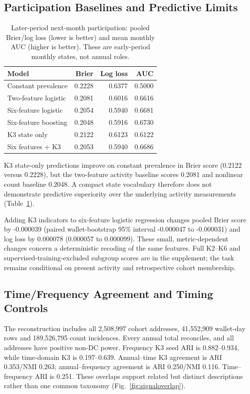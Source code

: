 \documentclass[journal,letterpaper]{IEEEtran}
\begin{document}
\subsection{Participation Baselines and Predictive Limits}
\begin{table}[t]
\centering\footnotesize
\caption{Later-period next-month participation: pooled Brier/log loss (lower is better) and mean monthly AUC (higher is better). These are early-period monthly states, not annual roles.}
\label{tab:participationprediction}
\begin{tabular}{lrrr}
\toprule
Model & Brier & Log loss & AUC \\
\midrule
Constant prevalence & 0.2228 & 0.6377 & 0.5000 \\
Two-feature logistic & 0.2081 & 0.6016 & 0.6616 \\
Six-feature logistic & 0.2054 & 0.5940 & 0.6681 \\
Six-feature boosting & 0.2048 & 0.5916 & 0.6730 \\
K3 state only & 0.2122 & 0.6123 & 0.6122 \\
Six features + K3 & 0.2053 & 0.5940 & 0.6686 \\
\bottomrule
\end{tabular}
\end{table}
K3 state-only predictions improve on constant prevalence in Brier score (0.2122 versus 0.2228), but the two-feature activity baseline scores 0.2081 and nonlinear count baseline 0.2048. A compact state vocabulary therefore does not demonstrate predictive superiority over the underlying activity measurements (Table~\ref{tab:participationprediction}).

Adding K3 indicators to six-feature logistic regression changes pooled Brier score by -0.000039 (paired wallet-bootstrap 95\% interval -0.000047 to -0.000031) and log loss by 0.000078 (0.000057 to 0.000099). These small, metric-dependent changes concern a deterministic recoding of the same features. Full K2--K6 and supervised-training-excluded subgroup scores are in the supplement; the task remains conditional on present activity and retrospective cohort membership.

\subsection{Time/Frequency Agreement and Timing Controls}
The reconstruction includes all 2,508,997 cohort addresses, 41,552,909 wallet-day rows and 189,526,795 count incidences. Every annual total reconciles, and all addresses have positive non-DC power. Frequency K3 seed ARI is 0.882--0.934, while time-domain K3 is 0.197--0.639. Annual--time K3 agreement is ARI 0.353/NMI 0.263; annual--frequency agreement is ARI 0.250/NMI 0.116. Time--frequency ARI is 0.251. These overlaps support related but distinct descriptions rather than one common taxonomy (Fig.~\ref{fig:signaloverlap}).
\end{document}
